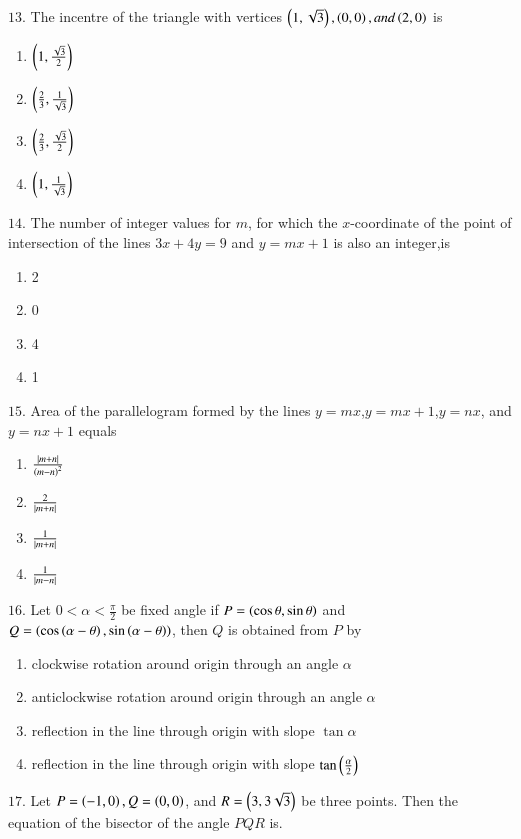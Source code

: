 \documentclass[journal,12pt,twocolumn]{IEEEtran}
\theoremstyle{remark}
\begin{document}
{\begin{enumerate}[label=\alph*]
\end{enumerate}
$13.$ The incentre of the triangle with vertices $\left(1,\sqrt{3}\right),\left(0,0\right),and \left(2,0\right)$ is \hfill{}
\begin{enumerate}[label=\alph*]
    \item $\left(1,\frac{\sqrt{3}}{2}\right)$
    \item $\left(\frac{2}{3},\frac{1}{\sqrt{3}}\right)$
    \item $\left(\frac{2}{3},\frac{\sqrt{3}}{2}\right)$
    \item $\left(1,\frac{1}{\sqrt{3}}\right)$
\end{enumerate}
$14$. The number of integer values for $m$, for which the $x$-coordinate of the point of intersection of the lines $3x+4y=9$ and $y=mx+1$ is also an integer,is \hfill{}
\begin{enumerate}[label=\alph*]
    \item 2
    \item 0
    \item 4
    \item 1
\end{enumerate}
$15$. Area of the parallelogram formed by the lines $y=mx$,$y=mx+1$,$y=nx$, and $y=nx+1$ equals \hfill{}
\begin{enumerate}[label=\alph*]
    \item $\frac{\left\vert m+n\right\vert}{\left(m-n\right)^{2}}$
    \item $\frac{2}{\left\vert m+n\right\vert}$
    \item $\frac{1}{\left\vert m+n\right\vert}$
    \item $\frac{1}{\left\vert m-n\right\vert}$
\end{enumerate}
$16$. Let $0<\alpha<\frac{\pi}{2}$ be fixed angle if $P=\left(\cos\theta,\sin\theta\right)$ and $Q=\left(\cos\left(\alpha-\theta\right),\sin\left(\alpha-\theta\right)\right)$, then $Q$ is obtained from $P$ by \hfill{}
\begin{enumerate}[label=\alph*]
    \item clockwise rotation around origin through an angle $\alpha$
    \item anticlockwise rotation around origin through an angle $\alpha$
    \item reflection in the line through origin with slope $\tan\alpha$
    \item reflection in the line through origin with slope $\tan\left(\frac{\alpha}{2}\right)$
\end{enumerate}
$17$. Let $P=\left(-1,0\right),Q=\left(0,0\right)$, and $R=\left(3,3\sqrt{3}\right)$ be three points. Then the equation of the bisector of the angle $PQR$ is. \hfill{}
}
\end{document}
